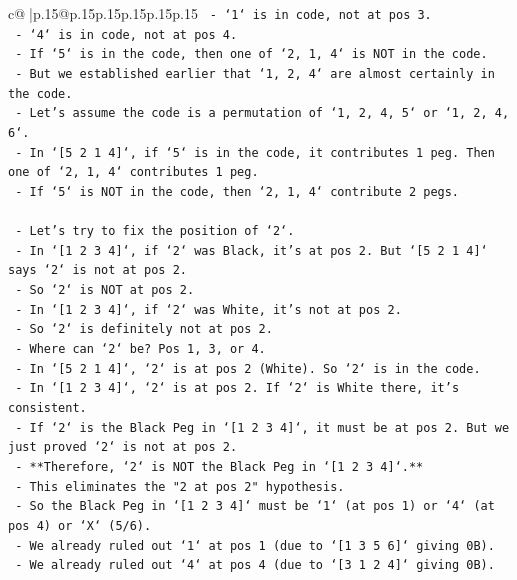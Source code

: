 \documentclass{article}
\begin{document}
{\begin{supertabular}{c@{$\;$}|p{.15\linewidth}@{}p{.15\linewidth}p{.15\linewidth}p{.15\linewidth}p{.15\linewidth}p{.15\linewidth}}
{{{\texttt{            {-} `1` is in code, not at pos 3.} \\
\texttt{            {-} `4` is in code, not at pos 4.} \\
\texttt{        {-} If `5` is in the code, then one of `2, 1, 4` is NOT in the code.} \\
\texttt{            {-} But we established earlier that `1, 2, 4` are almost certainly in the code.} \\
\texttt{            {-} Let's assume the code is a permutation of `1, 2, 4, 5` or `1, 2, 4, 6`.} \\
\texttt{            {-} In `{[}5 2 1 4{]}`, if `5` is in the code, it contributes 1 peg. Then one of `2, 1, 4` contributes 1 peg.} \\
\texttt{            {-} If `5` is NOT in the code, then `2, 1, 4` contribute 2 pegs.} \\
\\ 
\texttt{    {-} Let's try to fix the position of `2`.} \\
\texttt{        {-} In `{[}1 2 3 4{]}`, if `2` was Black, it's at pos 2. But `{[}5 2 1 4{]}` says `2` is not at pos 2.} \\
\texttt{        {-} So `2` is NOT at pos 2.} \\
\texttt{        {-} In `{[}1 2 3 4{]}`, if `2` was White, it's not at pos 2.} \\
\texttt{        {-} So `2` is definitely not at pos 2.} \\
\texttt{        {-} Where can `2` be? Pos 1, 3, or 4.} \\
\texttt{        {-} In `{[}5 2 1 4{]}`, `2` is at pos 2 (White). So `2` is in the code.} \\
\texttt{        {-} In `{[}1 2 3 4{]}`, `2` is at pos 2. If `2` is White there, it's consistent.} \\
\texttt{        {-} If `2` is the Black Peg in `{[}1 2 3 4{]}`, it must be at pos 2. But we just proved `2` is not at pos 2.} \\
\texttt{        {-} **Therefore, `2` is NOT the Black Peg in `{[}1 2 3 4{]}`.**} \\
\texttt{        {-} This eliminates the "2 at pos 2" hypothesis.} \\
\texttt{        {-} So the Black Peg in `{[}1 2 3 4{]}` must be `1` (at pos 1) or `4` (at pos 4) or `X` (5/6).} \\
\texttt{        {-} We already ruled out `1` at pos 1 (due to `{[}1 3 5 6{]}` giving 0B).} \\
\texttt{        {-} We already ruled out `4` at pos 4 (due to `{[}3 1 2 4{]}` giving 0B).} \\
}}}
\end{supertabular}}
\end{document}
